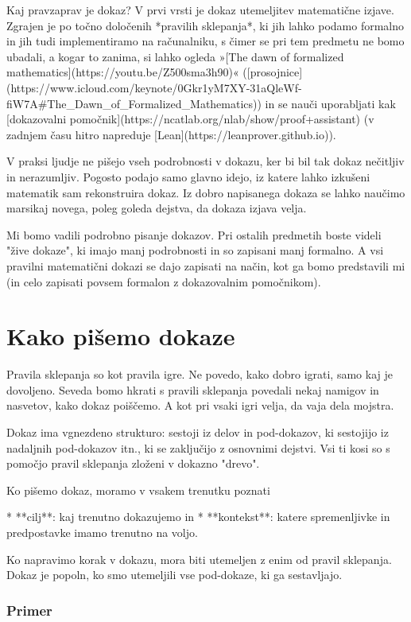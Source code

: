 Kaj pravzaprav je dokaz? V prvi vrsti je dokaz utemeljitev matematične izjave. Zgrajen je po točno določenih *pravilih
sklepanja*, ki jih lahko podamo formalno in jih tudi implementiramo na računalniku, s čimer se pri tem predmetu ne bomo
ubadali, a kogar to zanima, si lahko ogleda »[The dawn of formalized mathematics](https://youtu.be/Z500sma3h90)«
([prosojnice](https://www.icloud.com/keynote/0Gkr1yM7XY-31aQleWf-fiW7A#The_Dawn_of_Formalized_Mathematics)) in se nauči
uporabljati kak [dokazovalni pomočnik](https://ncatlab.org/nlab/show/proof+assistant) (v zadnjem času hitro napreduje [Lean](https://leanprover.github.io)).

V praksi ljudje ne pišejo vseh podrobnosti v dokazu, ker bi bil tak dokaz nečitljiv in nerazumljiv. Pogosto podajo samo
glavno idejo, iz katere lahko izkušeni matematik sam rekonstruira dokaz. Iz dobro napisanega dokaza se lahko naučimo
marsikaj novega, poleg goleda dejstva, da dokaza izjava velja.

Mi bomo vadili podrobno pisanje dokazov. Pri ostalih predmetih boste videli "žive dokaze", ki imajo manj podrobnosti in so zapisani manj formalno. A vsi pravilni matematični dokazi se dajo zapisati na način, kot ga bomo predstavili mi (in celo zapisati povsem formalon z dokazovalnim pomočnikom).

\section{Kako pišemo dokaze}

Pravila sklepanja so kot pravila igre. Ne povedo, kako dobro igrati, samo kaj je dovoljeno. Seveda bomo hkrati s pravili
sklepanja povedali nekaj namigov in nasvetov, kako dokaz poiščemo. A kot pri vsaki igri velja, da vaja dela mojstra.

Dokaz ima vgnezdeno strukturo: sestoji iz delov in pod-dokazov, ki sestojijo iz nadaljnih pod-dokazov itn., ki se
zaključijo z osnovnimi dejstvi. Vsi ti kosi so s pomočjo pravil sklepanja zloženi v dokazno "drevo".

Ko pišemo dokaz, moramo v vsakem trenutku poznati

* **cilj**: kaj trenutno dokazujemo in
* **kontekst**: katere spremenljivke in predpostavke imamo trenutno na voljo.

Ko napravimo korak v dokazu, mora biti utemeljen z enim od pravil sklepanja. Dokaz je
popoln, ko smo utemeljili vse pod-dokaze, ki ga sestavljajo.

\subsubsection{Primer}

